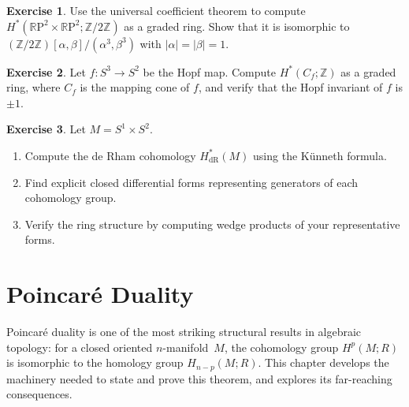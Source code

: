 \documentclass[12pt,a4paper,openany]{book}
\theoremstyle{definition}
\newtheorem{exercise}{Exercise}[chapter]
\theoremstyle{plain}
\theoremstyle{remark}
\newcommand{\Z}{\mathbb{Z}}
\newcommand{\RP}{\mathbb{R}\mathrm{P}}
\newcommand{\abs}[1]{\left|#1\right|}
\begin{document}
\begin{exercise}
Use the universal coefficient theorem to compute
$H^*(\RP^2\times\RP^2;\Z/2\Z)$ as a graded ring. Show that it is
isomorphic to
$(\Z/2\Z)[\alpha,\beta]/(\alpha^3,\beta^3)$
with $\abs{\alpha}=\abs{\beta}=1$.
\end{exercise}

\begin{exercise}
Let $f\colon S^3\to S^2$ be the Hopf map. Compute $H^*(C_f;\Z)$ as a
graded ring, where $C_f$ is the mapping cone of $f$, and verify that
the Hopf invariant of $f$ is $\pm 1$.
\end{exercise}

\begin{exercise}
Let $M=S^1\times S^2$.
\begin{enumerate}[label=(\alph*)]
  \item Compute the de Rham cohomology $H^*_{\mathrm{dR}}(M)$ using the
    K\"unneth formula.
  \item Find explicit closed differential forms representing generators of
    each cohomology group.
  \item Verify the ring structure by computing wedge products of your
    representative forms.
\end{enumerate}
\end{exercise}



\chapter{Poincar\'e Duality}\label{ch:poincare-duality}
\minitoc\bigskip

Poincar\'e duality is one of the most striking structural results in
algebraic topology: for a closed oriented $n$-manifold~$M$, the
cohomology group $H^p(M;R)$ is isomorphic to the homology group
$H_{n-p}(M;R)$.  This chapter develops the machinery needed to state
and prove this theorem, and explores its far-reaching consequences.

\end{document}
